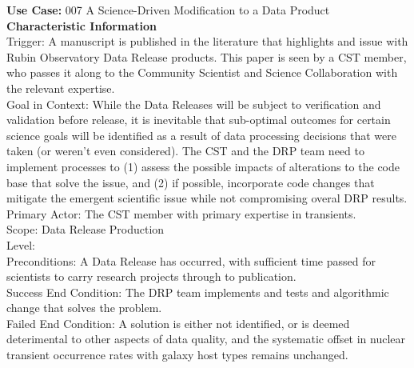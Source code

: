{\bf Use Case:} 007 A Science-Driven Modification to a Data Product \\

{\bf Characteristic Information} \\
Trigger: A manuscript is published in the literature that highlights and issue with Rubin Observatory Data Release products. This paper is seen by a CST member, who passes it along to the Community Scientist and Science Collaboration with the relevant expertise. \\
Goal in Context: While the Data Releases will be subject to verification and validation before release, it is inevitable that sub-optimal outcomes for certain science goals will be identified as a result of data processing decisions that were taken (or weren't even considered).  The CST and the DRP team need to implement processes to (1) assess the possible impacts of alterations to the code base that solve the issue, and (2) if possible, incorporate code changes that mitigate the emergent scientific issue while not compromising overal DRP results. \\
Primary Actor: The CST member with primary expertise in transients. \\
Scope: Data Release Production \\
Level: \\
Preconditions: A Data Release has occurred, with sufficient time passed for scientists to carry research projects through to publication. \\
Success End Condition: The DRP team implements and tests and algorithmic change that solves the problem. \\
Failed End Condition: A solution is either not identified, or is deemed deterimental to other aspects of data quality, and the systematic offset in nuclear transient occurrence rates with galaxy host types remains unchanged. \\

